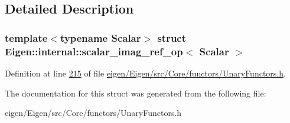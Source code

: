 \subsection{Detailed Description}
\subsubsection*{template$<$typename Scalar$>$\newline
struct Eigen\+::internal\+::scalar\+\_\+imag\+\_\+ref\+\_\+op$<$ Scalar $>$}



Definition at line \hyperlink{eigen_2_eigen_2src_2_core_2functors_2_unary_functors_8h_source_l00215}{215} of file \hyperlink{eigen_2_eigen_2src_2_core_2functors_2_unary_functors_8h_source}{eigen/\+Eigen/src/\+Core/functors/\+Unary\+Functors.\+h}.



The documentation for this struct was generated from the following file\+:\begin{DoxyCompactItemize}
\item 
eigen/\+Eigen/src/\+Core/functors/\+Unary\+Functors.\+h\end{DoxyCompactItemize}
